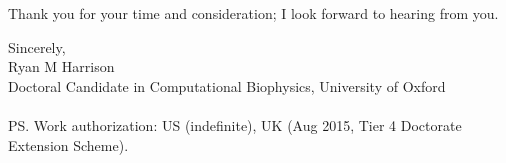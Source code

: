 \documentclass[a4paper]{../res}
\begin{document}
\begin{sloppypar}
\begin{resume}


Thank you for your time and consideration; I look forward to hearing from you.

Sincerely,
\\
Ryan M Harrison \\
Doctoral Candidate in Computational Biophysics, University of Oxford \\  \\
PS. Work authorization: US (indefinite), UK (Aug 2015, Tier 4 Doctorate Extension Scheme).

\end{resume} 
\end{sloppypar}
\end{document}
